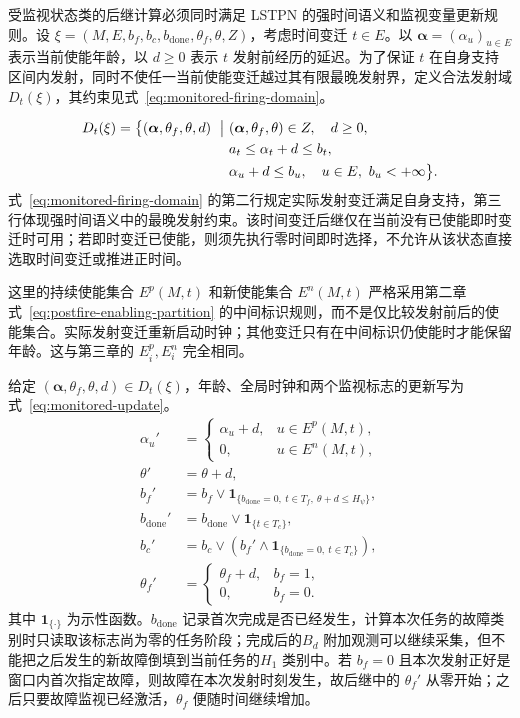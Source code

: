 \documentclass[master,fontset=ubuntu]{shnuthesis}
\theoremstyle{definition}
\begin{document}
受监视状态类的后继计算必须同时满足 LSTPN 的强时间语义和监视变量更新规则。设 \(\xi=(M,E,b_f,b_c,b_{\mathrm{done}},\theta_f,\theta,Z)\)，考虑时间变迁 \(t\in E\)。以 \(\boldsymbol\alpha=(\alpha_u)_{u\in E}\) 表示当前使能年龄，以 \(d\geq0\) 表示 \(t\) 发射前经历的延迟。为了保证 \(t\) 在自身支持区间内发射，同时不使任一当前使能变迁越过其有限最晚发射界，定义合法发射域 \(D_t(\xi)\)，其约束见式~\eqref{eq:monitored-firing-domain}。
\par\nopagebreak[4]
\begin{equation}
\begin{aligned}
D_t(\xi)=
\bigl\{
(\boldsymbol\alpha,\theta_f,\theta,d)\ \bigm|\ &
(\boldsymbol\alpha,\theta_f,\theta)\in Z,\quad d\geq0,\\
&a_t\leq\alpha_t+d\leq b_t,\\
&\alpha_u+d\leq b_u,\quad
u\in E,\ b_u<+\infty
\bigr\}.
\end{aligned}
\label{eq:monitored-firing-domain}
\end{equation}
式~\eqref{eq:monitored-firing-domain} 的第二行规定实际发射变迁满足自身支持，第三行体现强时间语义中的最晚发射约束。该时间变迁后继仅在当前没有已使能即时变迁时可用；若即时变迁已使能，则须先执行零时间即时选择，不允许从该状态直接选取时间变迁或推进正时间。

这里的持续使能集合 $E^p(M,t)$ 和新使能集合 $E^n(M,t)$ 严格采用第二章式~\eqref{eq:postfire-enabling-partition} 的中间标识规则，而不是仅比较发射前后的使能集合。实际发射变迁重新启动时钟；其他变迁只有在中间标识仍使能时才能保留年龄。这与第三章的 $E_i^p,E_i^n$ 完全相同。

给定 \((\boldsymbol\alpha,\theta_f,\theta,d)\in D_t(\xi)\)，年龄、全局时钟和两个监视标志的更新写为式~\eqref{eq:monitored-update}。
\begin{equation}
\begin{aligned}
\alpha_u'
&=
\begin{cases}
\alpha_u+d, & u\in E^p(M,t),\\
0, & u\in E^n(M,t),
\end{cases}\\
\theta'
&=\theta+d,\\
b_f'
&=
b_f\vee
\mathbf 1_{\{b_{\mathrm{done}}=0,\ t\in T_f,\ \theta+d\leq H_\psi\}},\\
b_{\mathrm{done}}'
&=b_{\mathrm{done}}\vee\mathbf 1_{\{t\in T_c\}},\\
b_c'
&=
b_c\vee
\left(
b_f'\wedge\mathbf 1_{\{b_{\mathrm{done}}=0,\ t\in T_c\}}
\right),\\
\theta_f'
&=
\begin{cases}
\theta_f+d, & b_f=1,\\
0, & b_f=0.
\end{cases}
\end{aligned}
\label{eq:monitored-update}
\end{equation}
其中 \(\mathbf 1_{\{\cdot\}}\) 为示性函数。\(b_{\mathrm{done}}\) 记录首次完成是否已经发生，计算本次任务的故障类别时只读取该标志尚为零的任务阶段；完成后的\(B_d\) 附加观测可以继续采集，但不能把之后发生的新故障倒填到当前任务的\(H_1\) 类别中。若 \(b_f=0\) 且本次发射正好是窗口内首次指定故障，则故障在本次发射时刻发生，故后继中的 \(\theta_f'\) 从零开始；之后只要故障监视已经激活，\(\theta_f\) 便随时间继续增加。
\end{document}
